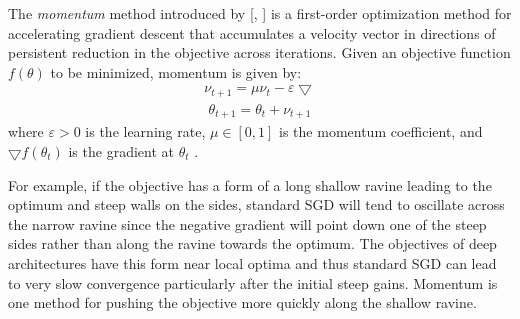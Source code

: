 The \textit{momentum} method introduced by [\citeauthor{polyak1964some}, \citeyear{polyak1964some}] is a first-order optimization method for accelerating gradient descent that accumulates a velocity vector in directions of persistent reduction in the objective across iterations. Given an objective function $f(\theta)$ to be minimized, momentum is given by:
\begin{equation}
	\label{eq:t}
	\begin{aligned}
		\nu_{t+1} = \mu\nu_t - \varepsilon\bigtriangledown 
	\end{aligned}
\end{equation}
\begin{equation}
	\label{eq:t}
	\begin{gathered}
	\theta_{t+1} = \theta_t + \nu_{t + 1}
	\end{gathered}
\end{equation}
where $\varepsilon > 0$ is the learning rate, $\mu \in [0,1]$ is the momentum coefficient, and $\bigtriangledown f(\theta_t)$ is the gradient at $\theta_t$ \cite{sutskever2013importance}. 

For example, if the objective has a form of a long shallow ravine leading to the optimum and steep walls on the sides, standard SGD will tend to oscillate across the narrow ravine since the negative gradient will point down one of the steep sides rather than along the ravine towards the optimum. The objectives of deep architectures have this form near local optima and thus standard SGD can lead to very slow convergence particularly after the initial steep gains. Momentum is one method for pushing the objective more quickly along the shallow ravine\cite{sgd}. 




